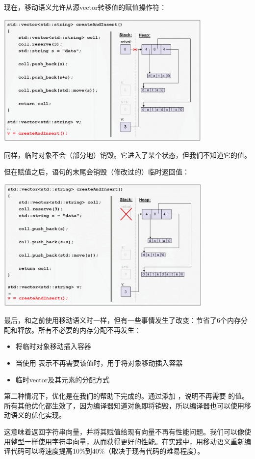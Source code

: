 \begin{itemize}
	现在，移动语义允许从源vector转移值的赋值操作符：
\begin{center}
		\includegraphics[width=0.8\textwidth]{part1/ch1/images/16}
	\end{center}
	同样，临时对象不会（部分地）销毁。它进入了某个状态，但我们不知道它的值。

	但在赋值之后，语句的末尾会销毁（修改过的）临时返回值：
\begin{center}
		\includegraphics[width=0.8\textwidth]{part1/ch1/images/17}
	\end{center}
\end{itemize}

最后，和之前使用移动语义时一样，但有一些事情发生了改变：节省了6个内存分配和释放。所有不必要的内存分配不再发生：

\begin{itemize}
	\item 将临时对象移动插入容器
	\item 当使用  表示不再需要该值时，用于将对象移动插入容器
	\item 临时vector及其元素的分配方式
\end{itemize}

第二种情况下，优化是在我们的帮助下完成的。通过添加 ，说明不再需要  的值。所有其他优化都生效了，因为编译器知道对象即将销毁，所以编译器也可以使用移动语义的优化实现。

这意味着返回字符串向量，并将其赋值给现有向量不再有性能问题。我们可以像使用整型一样使用字符串向量，从而获得更好的性能。在实践中，用移动语义重新编译代码可以将速度提高10\%到40\%（取决于现有代码的难易程度）。


























